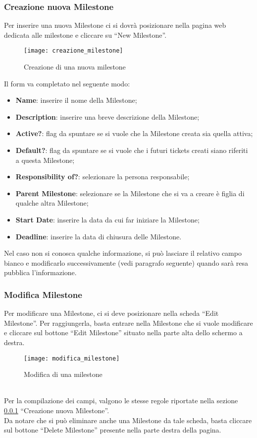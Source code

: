 \subsubsection{Creazione nuova Milestone}
\label{sec:creazione_milestone}
Per inserire una nuova Milestone ci si dovrà posizionare nella pagina web dedicata alle milestone e cliccare su ``New Milestone''.
\begin{figure}[h]
\texttt{[image: creazione\_milestone]}
\caption{Creazione di una nuova milestone} \label{fig:creazione_milestone}
\end{figure}
Il form va completato nel seguente modo:
\begin{itemize}
\item \textbf{Name}: inserire il nome della Milestone;
\item \textbf{Description}: inserire una breve descrizione della Milestone;
\item \textbf{Active?}: flag da spuntare se si vuole che la Milestone creata sia quella attiva;
\item \textbf{Default?}: flag da spuntare se si vuole che i futuri tickets creati siano riferiti a questa Milestone;
\item \textbf{Responsibility of?}: selezionare la persona responsabile;
\item \textbf{Parent Milestone}: selezionare se la Milestone che si va a creare è figlia di qualche altra Milestone;
\item \textbf{Start Date}: inserire la data da cui far iniziare la Milestone;
\item \textbf{Deadline}: inserire la data di chiusura delle Milestone.
\end{itemize}
Nel caso non si conosca qualche informazione, si può lasciare il relativo campo bianco e modificarlo successivamente (vedi paragrafo seguente) quando sarà resa pubblica l'informazione.

\subsubsection{Modifica Milestone}
Per modificare una Milestone, ci si deve posizionare nella scheda ``Edit Milestone''. Per raggiungerla, basta entrare nella Milestone che si vuole modificare e cliccare sul bottone ``Edit Milestone'' situato nella parte alta dello schermo a destra.
\begin{figure}[h]
\texttt{[image: modifica\_milestone]}
\caption{Modifica di una milestone} \label{fig:modifica_milestone}
\end{figure}
\\Per la compilazione dei campi, valgono le stesse regole riportate nella sezione \ref{sec:creazione_milestone} ``Creazione nuova Milestone''.
\\Da notare che si può eliminare anche una Milestone da tale scheda, basta cliccare sul bottone ``Delete Milestone'' presente nella parte destra della pagina.

